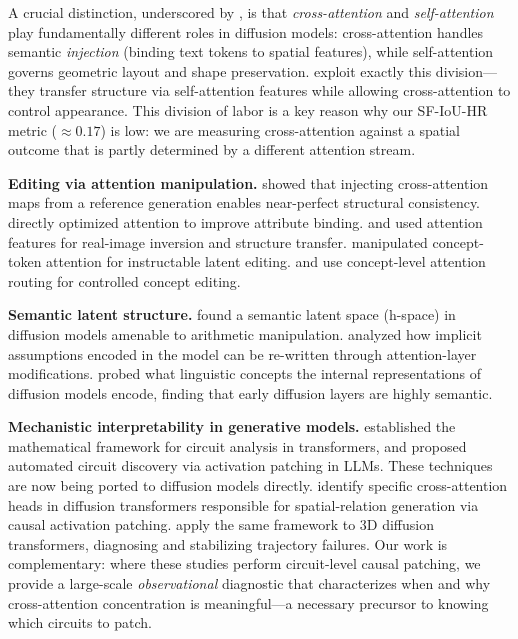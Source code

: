 \documentclass{article}
\begin{document}
A crucial distinction, underscored by \citet{ma2024crossself}, is
that \emph{cross-attention} and \emph{self-attention} play
fundamentally different roles in diffusion models: cross-attention
handles semantic \emph{injection} (binding text tokens to spatial
features), while self-attention governs geometric layout and shape
preservation.  \citet{tumanyan2023plug} exploit exactly this
division---they transfer structure via self-attention features while
allowing cross-attention to control appearance.  This division of
labor is a key reason why our SF-IoU-HR metric ($\approx 0.17$)
is low: we are measuring cross-attention against a spatial outcome
that is partly determined by a different attention stream.

\textbf{Editing via attention manipulation.}
\citet{hertz2023prompt} showed that injecting cross-attention maps
from a reference generation enables near-perfect structural
consistency.  \citet{chefer2023attend} directly optimized attention
to improve attribute binding.  \citet{mokady2023null} and
\citet{tumanyan2023plug} used attention features for real-image
inversion and structure transfer.  \citet{brack2023sega} manipulated
concept-token attention for instructable latent editing.
\citet{gandikota2024concept} and \citet{gandikota2024unified}
use concept-level attention routing for controlled concept editing.

\textbf{Semantic latent structure.}
\citet{kwon2023diffusion} found a semantic latent space (h-space)
in diffusion models amenable to arithmetic manipulation.
\citet{orgad2023editing} analyzed how implicit assumptions encoded
in the model can be re-written through attention-layer modifications.
\citet{chefer2024hidden} probed what linguistic concepts the internal
representations of diffusion models encode, finding that early
diffusion layers are highly semantic.

\textbf{Mechanistic interpretability in generative models.}
\citet{elhage2021mathematical} established the mathematical framework
for circuit analysis in transformers, and \citet{conmy2023towards}
proposed automated circuit discovery via activation patching in LLMs.
These techniques are now being ported to diffusion models directly.
\citet{li2026circuit} identify specific cross-attention heads in
diffusion transformers responsible for spatial-relation generation via
causal activation patching.  \citet{chen2026circuits3d} apply the
same framework to 3D diffusion transformers, diagnosing and
stabilizing trajectory failures.  Our work is complementary:
where these studies perform circuit-level causal patching,
we provide a large-scale \emph{observational} diagnostic that
characterizes when and why cross-attention concentration is
meaningful---a necessary precursor to knowing which circuits
to patch.
\end{document}
